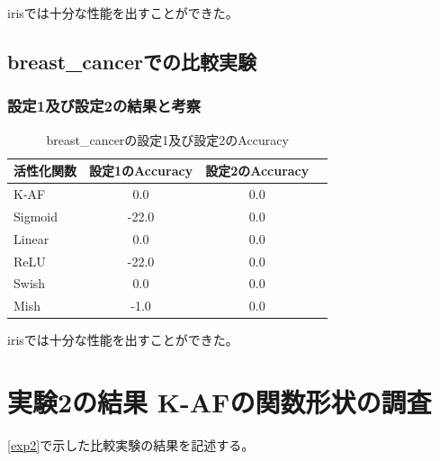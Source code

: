 irisでは十分な性能を出すことができた。



\subsection{breast\_cancerでの比較実験}
\label{ev:breastcancer}

\subsubsection{設定1及び設定2の結果と考察}


\begin{table}[htbp]
    \begin{center}
        \caption{breast_cancerの設定1及び設定2のAccuracy}
        \vspace{2mm} 
        \begin{tabular}{l*{2}{c}r}
            活性化関数              & 設定1のAccuracy &  設定2のAccuracy \\
            \hline
            K-AF            & 0.0 & 0.0 \\
            Sigmoid            & -22.0 & 0.0\\
            Linear            & 0.0 & 0.0\\
            ReLU        & -22.0 & 0.0\\
            Swish           & 0.0 & 0.0 \\
            Mish           & -1.0 & 0.0\\
    
        \end{tabular}
    \end{center}
\end{table}



irisでは十分な性能を出すことができた。




\section{実験2の結果 K-AFの関数形状の調査}
\label{evo2}
\ref{exp2}で示した比較実験の結果を記述する。


